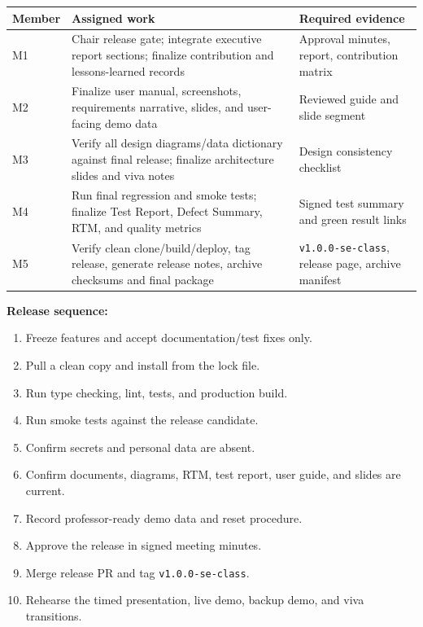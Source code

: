 \documentclass[
  10pt,
  a4paper,
  oneside]{report}
\newcounter{none} %
\providecommand{\tightlist}{%
  \setlength{\itemsep}{0pt}\setlength{\parskip}{0pt}}
\begin{document}
{\def\LTcaptype{none} %
\begin{longtable}[]{@{}
  >{\raggedright\arraybackslash}p{}
  >{\raggedright\arraybackslash}p{}
  >{\raggedright\arraybackslash}p{}@{}}
\toprule\noalign{}
\begin{minipage}[b]{\linewidth}\raggedright
Member
\end{minipage} & \begin{minipage}[b]{\linewidth}\raggedright
Assigned work
\end{minipage} & \begin{minipage}[b]{\linewidth}\raggedright
Required evidence
\end{minipage} \\
\midrule\noalign{}
\endhead
\bottomrule\noalign{}
\endlastfoot
M1 & Chair release gate; integrate executive report sections; finalize
contribution and lessons-learned records & Approval minutes, report,
contribution matrix \\
M2 & Finalize user manual, screenshots, requirements narrative, slides,
and user-facing demo data & Reviewed guide and slide segment \\
M3 & Verify all design diagrams/data dictionary against final release;
finalize architecture slides and viva notes & Design consistency
checklist \\
M4 & Run final regression and smoke tests; finalize Test Report, Defect
Summary, RTM, and quality metrics & Signed test summary and green result
links \\
M5 & Verify clean clone/build/deploy, tag release, generate release
notes, archive checksums and final package & \texttt{v1.0.0-se-class},
release page, archive manifest \\
\end{longtable}
}

\textbf{Release sequence:}

\begin{enumerate}
\def\labelenumi{\arabic{enumi}.}
\tightlist
\item
  Freeze features and accept documentation/test fixes only.
\item
  Pull a clean copy and install from the lock file.
\item
  Run type checking, lint, tests, and production build.
\item
  Run smoke tests against the release candidate.
\item
  Confirm secrets and personal data are absent.
\item
  Confirm documents, diagrams, RTM, test report, user guide, and slides
  are current.
\item
  Record professor-ready demo data and reset procedure.
\item
  Approve the release in signed meeting minutes.
\item
  Merge release PR and tag \texttt{v1.0.0-se-class}.
\item
  Rehearse the timed presentation, live demo, backup demo, and viva
  transitions.
\end{enumerate}
\end{document}
